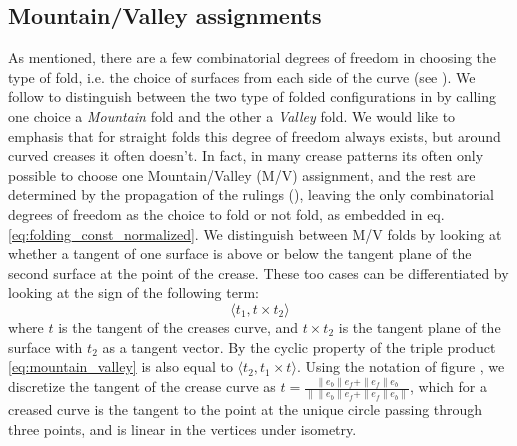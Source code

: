 \subsection{Mountain/Valley assignments} As mentioned, there are a few combinatorial degrees of freedom in choosing the type of fold, i.e. the choice of surfaces from each side of the curve (see ). We follow \cite{demaine_lens} to distinguish between the two type of folded configurations in  by calling one choice a \textit{Mountain} fold and the other a \textit{Valley} fold. We would like to emphasis that for straight folds this degree of freedom always exists, but around curved creases it often doesn't. In fact, in many crease patterns its often only possible to choose  one Mountain/Valley (M/V) assignment, and the rest are determined by the propagation of the rulings (), leaving the only combinatorial degrees of freedom  as the choice to fold or not fold, as embedded in eq. \eqref{eq:folding_const_normalized}.
  We distinguish between M/V folds by looking at whether a tangent of one surface is above or below the tangent plane of the second surface at the point of the crease. These too cases can be differentiated by looking at the sign of the following term:
\begin{equation} \label{eq:mountain_valley}
\langle t_1, t \times t_2 \rangle 
\end{equation}
where $t$ is the tangent of the creases curve, and $t \times t_2$ is the tangent plane of the surface with $t_2$ as a tangent vector. By the cyclic property of the triple product \eqref{eq:mountain_valley} is also equal to $\langle t_2, t_1 \times t \rangle$.
Using the notation of figure , we discretize the tangent of the crease curve as $t = \frac{\|e_b\|e_f + \|e_f\|e_b}{\|\|e_b\|e_f + \|e_f\|e_b\|}$, which for a creased curve is the tangent to the point at the unique circle passing through three points, and is linear in the vertices under isometry. 
